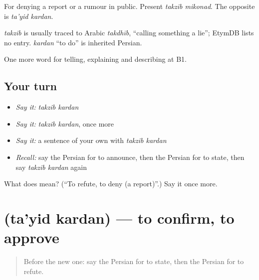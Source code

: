 For denying a report or a rumour in public. Present \emph{takzib mikonad}. The opposite is \emph{ta'yid kardan}.

\begin{cousinweb}
\emph{takzib} is usually traced to Arabic \emph{takdhīb}, \textquotedblleft{}calling something a lie\textquotedblright{}; EtymDB lists no entry. \emph{kardan} \textquotedblleft{}to do\textquotedblright{} is inherited Persian.
\end{cousinweb}

\begin{grammarlens}[title={What you've built}]
One more word for telling, explaining and describing at B1.
\end{grammarlens}

\subsection*{Your turn}
\begin{itemize}
\raggedright
  \item \emph{Say it:} \emph{takzib kardan}
  \item \emph{Say it:} \emph{takzib kardan}, once more
  \item \emph{Say it:} a sentence of your own with \emph{takzib kardan}
  \item \emph{Recall:} say the Persian for to announce, then the Persian for to state, then say \emph{takzib kardan} again
\end{itemize}

\begin{tcolorbox}[breakable,colback=teal!4,colframe=teal!35!black,title={Before you move on}]
What does   mean? (\textquotedblleft{}To refute, to deny (a report)\textquotedblright{}.) Say it once more.
\end{tcolorbox}
\section[\texorpdfstring{\fa{تایید} \fa{کردن} (ta'yid kardan)}{تایید کردن (ta'yid kardan)}]{  (ta'yid kardan) — to confirm, to approve}

\label{lesson:FA-C310-tayid-kardan}



\begin{quote}
Before the new one: say the Persian for to state, then the Persian for to refute.
\end{quote}

